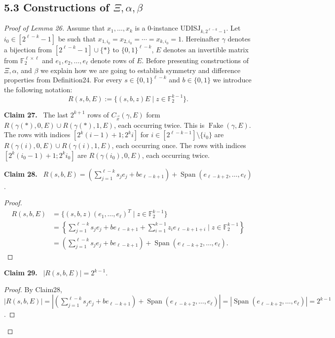 \documentclass[10pt,a4paper]{article}
\newenvironment{authorclaim}[1]{\par\medskip\noindent\textbf{#1.}\ \ignorespaces}{\par\medskip}
\begin{document}
\subsection*{5.3 Constructions of $\Xi,\alpha,\beta$}
\begin{proof}[Proof of Lemma 26]
Assume that $x_1,\ldots,x_k$ is a 0-instance $\mathrm{UDISJ}_{k,2^{\ell-k}-1}$. Let $i_0\in[2^{\ell-k}-1]$ be such that $x_{1,i_0}=x_{2,i_0}=\cdots=x_{k,i_0}=1$. Hereinafter $\gamma$ denotes a bijection from $[2^{\ell-k}-1]\cup\{*\}$ to $\{0,1\}^{\ell-k}$, $E$ denotes an invertible matrix from $\mathbb F_2^{\ell\times\ell}$ and $e_1,e_2,\ldots,e_\ell$ denote rows of $E$. Before presenting constructions of $\Xi,\alpha$, and $\beta$ we explain how we are going to establish symmetry and difference properties from Definition24. For every $s\in\{0,1\}^{\ell-k}$ and $b\in\{0,1\}$ we introduce the following notation:
\[
R(s,b,E):=\{(s,b,z)E\mid z\in\mathbb F_2^{k-1}\}.
\]
\begin{authorclaim}{Claim 27}
The last $2^{k+1}$ rows of $C_{\vec x}(\gamma,E)$ form $R(\gamma(*),0,E)\cup R(\gamma(*),1,E)$, each occurring twice. This is $\operatorname{Fake}(\gamma,E)$.
The rows with indices $[2^k(i-1)+1;2^ki]$ for $i\in[2^{\ell-k-1}]\setminus\{i_0\}$ are $R(\gamma(i),0,E)\cup R(\gamma(i),1,E)$, each occurring once.
The rows with indices $[2^k(i_0-1)+1;2^ki_0]$ are $R(\gamma(i_0),0,E)$, each occurring twice.
\end{authorclaim}
\begin{authorclaim}{Claim 28}
$R(s,b,E)=(\sum_{j=1}^{\ell-k}s_je_j+be_{\ell-k+1})+\operatorname{Span}(e_{\ell-k+2},\ldots,e_\ell)$.
\end{authorclaim}
\begin{proof}
\begin{align*}
R(s,b,E)&=\{(s,b,z)(e_1,\ldots,e_\ell)^T\mid z\in\mathbb F_2^{k-1}\}\\
&=\left\{\sum_{j=1}^{\ell-k}s_je_j+be_{\ell-k+1}+\sum_{i=1}^{k-1}z_ie_{\ell-k+1+i}\mid z\in\mathbb F_2^{k-1}\right\}\\
&=\left(\sum_{j=1}^{\ell-k}s_je_j+be_{\ell-k+1}\right)+\operatorname{Span}(e_{\ell-k+2},\ldots,e_\ell).
\end{align*}
\end{proof}
\begin{authorclaim}{Claim 29}
$|R(s,b,E)|=2^{k-1}$.
\end{authorclaim}
\begin{proof}
By Claim28, $|R(s,b,E)|=|(\sum_{j=1}^{\ell-k}s_je_j+be_{\ell-k+1})+\operatorname{Span}(e_{\ell-k+2},\ldots,e_\ell)|=|\operatorname{Span}(e_{\ell-k+2},\ldots,e_\ell)|=2^{k-1}$.

\end{proof}
\end{proof}
\end{document}
